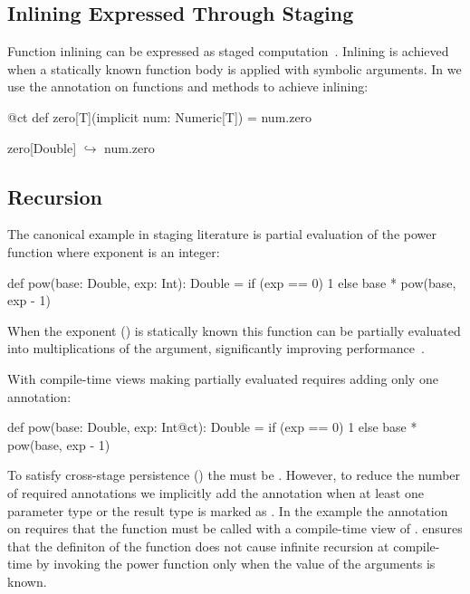 \subsection{Inlining Expressed Through Staging}
\label{sct:inlining}

Function inlining can be expressed as staged computation~\cite{monnier2003inlining}.
 Inlining is achieved when a statically known function body is applied with symbolic
 arguments. In \tool we use the  annotation on functions and methods to achieve inlining:\begin{lstparagraph}
@ct def zero[T](implicit num: Numeric[T]) = num.zero

zero[Double]
  $\hookrightarrow$ num.zero
\end{lstparagraph}


\subsection{Recursion}
\label{sct:recursion}

The canonical example in staging literature is partial evaluation of the power function
 where exponent is an integer:
\begin{lstparagraph}
def pow(base: Double, exp: Int): Double =
  if (exp == 0) 1 else base * pow(base, exp - 1)
\end{lstparagraph} When the exponent () is statically known this function can be partially
evaluated into  multiplications of the  argument, significantly
improving performance~\cite{calcagno2003implementing}.

With compile-time views making  partially evaluated requires adding only one annotation:

\begin{lstparagraph}
def pow(base: Double, exp: Int@ct): Double =
  if (exp == 0) 1 else base * pow(base, exp - 1)
\end{lstparagraph}

To satisfy cross-stage persistence () the  must be .
However, to reduce the number of required annotations we implicitly add the  annotation
when at least one parameter type or the result type is marked as . In the example
 the  annotation on  requires that the function must be called with
 a compile-time view of . \tool ensures that the definiton of the  function
 does not cause infinite recursion at compile-time by invoking the power function
 only when the value of the  arguments is known.

